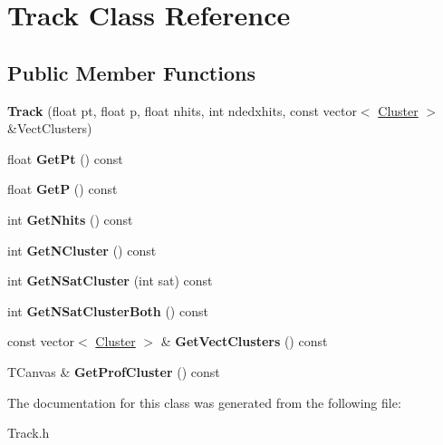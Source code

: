 \hypertarget{class_track}{}\section{Track Class Reference}
\label{class_track}
\subsection*{Public Member Functions}
\begin{DoxyCompactItemize}
\item 
\mbox{\label{class_track_ac8148404adcb009a511f32f806999ffb}} 
{\bfseries Track} (float pt, float p, float nhits, int ndedxhits, const vector$<$ \mbox{\hyperlink{class_cluster}{Cluster}} $>$ \&Vect\+Clusters)
\item 
\mbox{\label{class_track_ad3557a62307bddecbedeb9002a50fdd9}} 
float {\bfseries Get\+Pt} () const
\item 
\mbox{\label{class_track_ab311e6b5c9af0b63855ec181e39f8cfe}} 
float {\bfseries GetP} () const
\item 
\mbox{\label{class_track_a2a1b4d51374ae6612e542bbd6a4735a1}} 
int {\bfseries Get\+Nhits} () const
\item 
\mbox{\label{class_track_a7527010eb0adc585256b8e85ff74a2c5}} 
int {\bfseries Get\+N\+Cluster} () const
\item 
\mbox{\label{class_track_a1add61bfd7b9c12894fd5068de0520dc}} 
int {\bfseries Get\+N\+Sat\+Cluster} (int sat) const
\item 
\mbox{\label{class_track_a9cd2bbb5c8cdbbcb5aec939dc5737620}} 
int {\bfseries Get\+N\+Sat\+Cluster\+Both} () const
\item 
\mbox{\label{class_track_afb3c60d568d51bfd703f54b0360bdb87}} 
const vector$<$ \mbox{\hyperlink{class_cluster}{Cluster}} $>$ \& {\bfseries Get\+Vect\+Clusters} () const
\item 
\mbox{\label{class_track_a90b620bae857f86202eccbc6e0db3978}} 
T\+Canvas \& {\bfseries Get\+Prof\+Cluster} () const
\end{DoxyCompactItemize}


The documentation for this class was generated from the following file\+:\begin{DoxyCompactItemize}
\item 
Track.\+h\end{DoxyCompactItemize}
